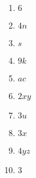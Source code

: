 \begin{multicols}{2}
\begin{enumerate}[label=\textbf{\arabic*}., itemsep=5pt]
\item $6$%
\item $4n$%
\item $s$%
\item $9k$%
\item $ac$%
\item $2xy$%
\item $3u$%
\item $3x$%
\item $4yz$%
\item $3$%
\end{enumerate}
\end{multicols}

